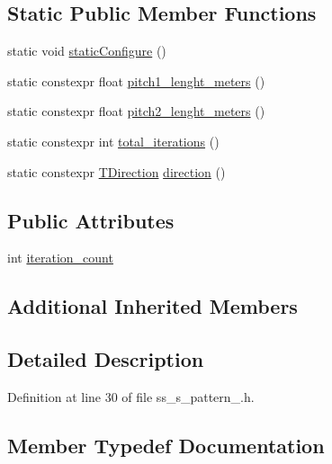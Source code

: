 \subsection*{Static Public Member Functions}
\begin{DoxyCompactItemize}
\item 
static void \hyperlink{structsm__dance__bot_1_1SS5_1_1SsSPattern1_a203b4e61bea71a82f1b56b19ac25bf59}{static\+Configure} ()
\item 
static constexpr float \hyperlink{structsm__dance__bot_1_1SS5_1_1SsSPattern1_a32bf83535c603665005956c1a8cf71a7}{pitch1\+\_\+lenght\+\_\+meters} ()
\item 
static constexpr float \hyperlink{structsm__dance__bot_1_1SS5_1_1SsSPattern1_a5e923410f8aad0bdc57cf689e8cf1408}{pitch2\+\_\+lenght\+\_\+meters} ()
\item 
static constexpr int \hyperlink{structsm__dance__bot_1_1SS5_1_1SsSPattern1_a85e3580f9375fde963ea4204305ad27d}{total\+\_\+iterations} ()
\item 
static constexpr \hyperlink{namespacesm__dance__bot_1_1SS5_aaa01c87b9245bbff2b581cefd6f3b346}{T\+Direction} \hyperlink{structsm__dance__bot_1_1SS5_1_1SsSPattern1_abe6ab6e7e6630e67566c0fee58ce565f}{direction} ()
\end{DoxyCompactItemize}
\subsection*{Public Attributes}
\begin{DoxyCompactItemize}
\item 
int \hyperlink{structsm__dance__bot_1_1SS5_1_1SsSPattern1_ac1b4a50a642face1106fd58d026067ac}{iteration\+\_\+count}
\end{DoxyCompactItemize}
\subsection*{Additional Inherited Members}


\subsection{Detailed Description}


Definition at line 30 of file ss\+\_\+s\+\_\+pattern\+\_.\+h.



\subsection{Member Typedef Documentation}
\mbox{\label{structsm__dance__bot_1_1SS5_1_1SsSPattern1_a6c5b86a52543caf627a571c543f6eda8}} 
